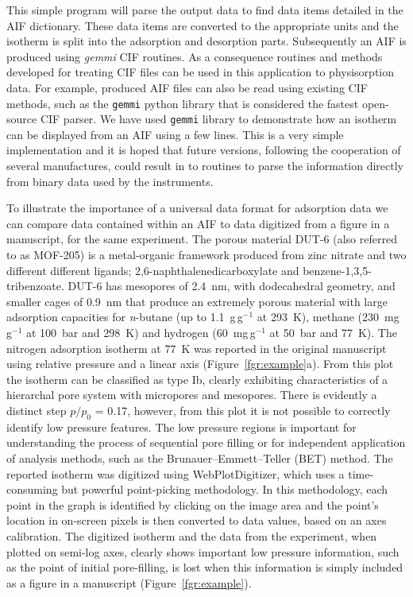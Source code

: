 \documentclass[journal=langd5,manuscript=article]{achemso}
\begin{document}
This simple program will parse the output data to find data items detailed in the AIF dictionary.
These data items are converted to the appropriate units and the isotherm is split into the adsorption and desorption parts.
Subsequently an AIF is produced using \textit{gemmi} CIF routines.\cite{gemmi}
As a consequence routines and methods developed for treating CIF files can be used in this application to physisorption data.
For example, produced AIF files can also be read using existing CIF methods, such as the \texttt{gemmi} python library that is considered the fastest open-source CIF parser.\cite{gemmi}
We have used \texttt{gemmi} library to demonstrate how an isotherm can be displayed from an AIF using a few lines.
This is a very simple implementation and it is hoped that future versions, following the cooperation of several manufactures, could result in to routines to parse the information directly from binary data used by the instruments.

To illustrate the importance of a universal data format for adsorption data we can compare data contained within an AIF to data digitized from a figure in a manuscript, for the same experiment.
The porous material DUT-6 (also referred to as MOF-205) is a metal-organic framework produced from zinc nitrate and two different different ligands; 2,6-naphthalenedicarboxylate and benzene-1,3,5-tribenzoate.\cite{10.1002/anie.200904599}
DUT-6 has mesopores of 2.4~nm, with dodecahedral geometry, and smaller cages of 0.9~nm that produce an extremely porous material with large adsorption capacities for \textit{n}-butane (up to 1.1~g$\,$g$^{-1}$ at 293~K),  methane (230~mg$\,$g$^{-1}$ at 100~bar and 298~K) and hydrogen (60~mg$\,$g$^{-1}$ at 50~bar and 77~K).
The nitrogen adsorption isotherm at 77~K was reported in the original manuscript using relative pressure and a linear axis (Figure~\ref{fgr:example}a).
From this plot the isotherm can be classified  as  type  Ib, clearly exhibiting characteristics of a hierarchal pore system with micropores and mesopores.
There is evidently a distinct step $p/p_0$ = 0.17, however, from this plot it is not possible to correctly identify low pressure features.
The low pressure regions is important for understanding the process of sequential pore filling or for independent application of analysis methods, such as the Brunauer–Emmett–Teller (BET) method.\cite{10.1016/S0167-2991(07)80008-5}
The reported isotherm was digitized using WebPlotDigitizer, which uses a time-consuming but powerful point-picking methodology.\cite{webplotdigitizer}
In this methodology, each point in the graph is identified by clicking on the image area and the point's location in on-screen pixels is then converted to data values, based on an axes calibration.
The digitized isotherm and the data from the experiment, when plotted on semi-log axes, clearly shows important low pressure information, such as the point of initial pore-filling, is lost when this information is simply included as a figure in a manuscript (Figure~\ref{fgr:example}).
\end{document}
